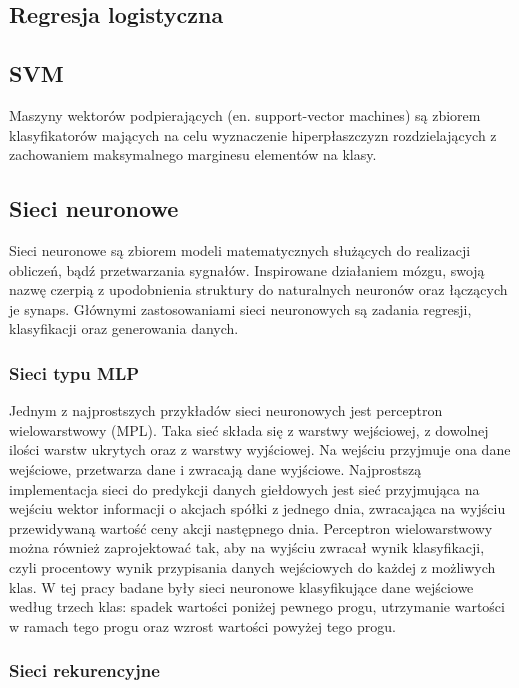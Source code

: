 \documentclass[a4paper, twoside, 11pt, openright]{article}
\begin{document}
\subsection{Regresja logistyczna}

\subsection{SVM}

Maszyny wektorów podpierających (en. support-vector machines) są zbiorem klasyfikatorów mających na celu wyznaczenie hiperpłaszczyzn rozdzielających z zachowaniem maksymalnego marginesu elementów na klasy.

\subsection{Sieci neuronowe}

Sieci neuronowe są zbiorem modeli matematycznych służących do realizacji obliczeń, bądź przetwarzania sygnałów. Inspirowane działaniem mózgu, swoją nazwę czerpią z upodobnienia struktury do naturalnych neuronów oraz łączących je synaps. Głównymi zastosowaniami sieci neuronowych są zadania regresji, klasyfikacji oraz generowania danych.

\subsubsection{Sieci typu MLP}

Jednym z najprostszych przykładów sieci neuronowych jest perceptron wielowarstwowy (MPL). Taka sieć składa się z warstwy wejściowej, z dowolnej ilości warstw ukrytych oraz z warstwy wyjściowej. Na wejściu przyjmuje ona dane wejściowe, przetwarza dane i zwracają dane wyjściowe. Najprostszą implementacja sieci do predykcji danych giełdowych jest sieć przyjmująca na wejściu wektor informacji o akcjach spółki z jednego dnia, zwracająca na wyjściu przewidywaną wartość ceny akcji następnego dnia. Perceptron wielowarstwowy można również zaprojektować tak, aby na wyjściu zwracał wynik klasyfikacji, czyli procentowy wynik przypisania danych wejściowych do każdej z możliwych klas. W tej pracy badane były sieci neuronowe klasyfikujące dane wejściowe według trzech klas: spadek wartości poniżej pewnego progu, utrzymanie wartości w ramach tego progu oraz wzrost wartości powyżej tego progu. 

\subsubsection{Sieci rekurencyjne}
\end{document}
